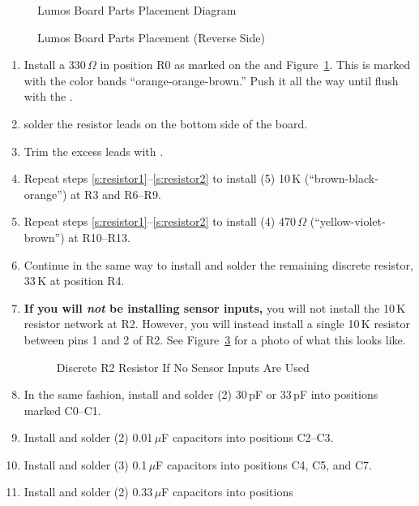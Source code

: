 \documentclass[letterpaper,twoside,onecolumn,openright,final]{memoir}
\begin{document}
\begin{figure}
\centerline{}
\caption{Lumos Board Parts Placement Diagram\label{fig:placement}}
\end{figure}
\begin{figure}
\centerline{}
\caption{Lumos Board Parts Placement (Reverse Side)\label{fig:placement-back}}
\end{figure}

\begin{enumerate}

\item\label{s:resistor1}
	Install a 330\,$\Omega$  in position R0 as marked on the 
	and Figure~\ref{fig:placement}.  This is marked with the color bands ``orange-orange-brown.'' 
	Push it all the way until flush with the .
\item	solder the resistor leads on the bottom side of the board.  
\item\label{s:resistor2}
	Trim the excess leads with .
\item	Repeat steps \ref{s:resistor1}--\ref{s:resistor2} to 
	install (5) 10\,K  (``brown-black-orange'') at R3
	and R6--R9.
\item	Repeat steps \ref{s:resistor1}--\ref{s:resistor2}
	to install (4) 470\,$\Omega$  (``yellow-violet-brown'') at R10--R13.
\item	Continue in the same way to install and solder the remaining discrete
resistor, 33\,K at position R4.
\item	{\bfseries If you will \emph{not} be installing sensor inputs,} you will not
	install the 10\,K resistor network at R2.  However, you will instead install a single
	10\,K resistor between pins 1 and 2 of R2.  See Figure~\ref{fig:r2-single} for a photo
	of what this looks like.
\begin{figure}
	\centerline{}
	\caption{Discrete R2 Resistor If No Sensor Inputs Are Used\label{fig:r2-single}}
\end{figure}
\item	In the same fashion, install and solder (2) 30\,pF or 33\,pF  into positions marked C0--C1.
\item	Install and solder (2) 0.01\,$\mu$F capacitors into positions 
	C2--C3.
\item	Install and solder (3) 0.1\,$\mu$F capacitors into positions C4, 
	C5, and C7.
\item	Install and solder (2) 0.33\,$\mu$F capacitors into positions 

\end{enumerate}
\end{document}
